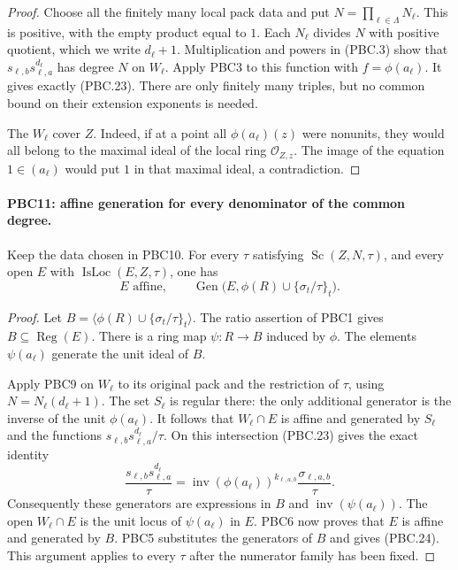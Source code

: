\documentclass[11pt,a4paper]{article}
\numberwithin{equation}{section}
\theoremstyle{remark}\newtheorem{remark}[theorem]{Remark}
\begin{document}
\begin{proof}
Choose all the finitely many local pack data and put
$N=\prod_{\ell\in\Lambda}N_\ell$.  This is positive, with
the empty product equal to $1$.  Each $N_\ell$ divides $N$
with positive quotient, which we write $d_\ell+1$.
Multiplication and powers in (PBC.3) show that
$s_{\ell,b}s_{\ell,a}^{d_\ell}$ has degree $N$ on
$W_\ell$.  Apply PBC3 to this function with
$f=\phi(a_\ell)$.  It gives exactly (PBC.23).
There are only finitely many triples, but no common bound on their
extension exponents is needed.

The $W_\ell$ cover $Z$.  Indeed, if at a point all
$\phi(a_\ell)(z)$ were nonunits, they would all belong to the
maximal ideal of the local ring $\mathcal O_{Z,z}$.
The image of the equation $1\in(a_\ell)$ would put $1$ in that
maximal ideal, a contradiction.
\end{proof}

\paragraph{PBC11: affine generation for every denominator of the common degree.}
\label{claim:PBC11}
Keep the data chosen in PBC10.  For every $\tau$ satisfying
$\operatorname{Sc}(Z,N,\tau)$, and every open $E$ with
$\operatorname{IsLoc}(E,Z,\tau)$, one has
\[
 E\text{ affine},\qquad
 \operatorname{Gen}\bigl(E,\phi(R)\cup\{\sigma_t/\tau\}_t\bigr).
                                                        \tag{PBC.24}
\]

\begin{proof}
Let $B=\langle\phi(R)\cup\{\sigma_t/\tau\}_t\rangle$.
The ratio assertion of PBC1 gives $B\subseteq\operatorname{Reg}(E)$.
There is a ring map $\psi:R\to B$ induced by $\phi$.
The elements $\psi(a_\ell)$ generate the unit ideal of $B$.

Apply PBC9 on $W_\ell$ to its original pack and the restriction
of $\tau$, using $N=N_\ell(d_\ell+1)$.
The set $S_\ell$ is regular there: the only additional generator
is the inverse of the unit $\phi(a_\ell)$.
It follows that $W_\ell\cap E$ is affine and generated by
$S_\ell$ and the functions
$s_{\ell,b}s_{\ell,a}^{d_\ell}/\tau$.
On this intersection (PBC.23) gives the exact identity
\[
 \frac{s_{\ell,b}s_{\ell,a}^{d_\ell}}{\tau}
   =\operatorname{inv}(\phi(a_\ell))^{k_{\ell,a,b}}
               \frac{\sigma_{\ell,a,b}}{\tau}.
                                                        \tag{PBC.25}
\]
Consequently these generators are expressions in $B$ and
$\operatorname{inv}(\psi(a_\ell))$.  The open
$W_\ell\cap E$ is the unit locus of $\psi(a_\ell)$ in $E$.
PBC6 now proves that $E$ is affine and generated by $B$.
PBC5 substitutes the generators of $B$ and gives (PBC.24).
This argument applies to every $\tau$ after the numerator family
has been fixed.
\end{proof}
\end{document}

